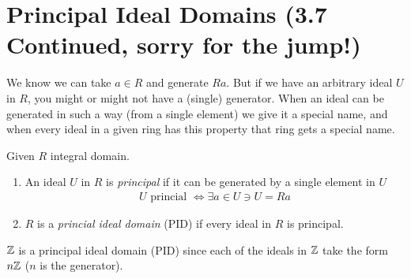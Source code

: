 \section{Principal Ideal Domains (3.7 Continued, sorry for the jump!)}
We know we can take $a\in R$ and generate $Ra$. But if we have an arbitrary ideal $U$ in $R$, you might or might not have a (single) generator. 
When an ideal can be generated in such a way (from a single element) we give it a special name, and when every ideal in a given ring has this property that ring gets a special name.
\begin{definition}
    Given $R$ integral domain.
    \begin{enumerate}
        \item An ideal $U$ in $R$ is \textit{principal} if it can be generated by a single element in $U$
        \begin{align}
            U \text{ princial }\iff \exists a \in U \ni U = Ra \nonumber
        \end{align}
        \item $R$ is a \textit{princial ideal domain} (PID) if every ideal in $R$ is principal.
    \end{enumerate}
\end{definition}
${\mathbb{ Z}}$ is a principal ideal domain (PID) since each of the ideals in ${\mathbb{ Z}}$ take the form $n{\mathbb{ Z}}$ ($n$ is the generator). 
